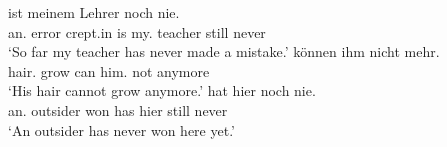 \documentclass[output=paper
 	        ,biblatex
                ,babelshorthands
                ,newtxmath
                ,draftmode
                ,colorlinks, citecolor=brown
]{langscibook}
\begin{document}
\begin{exe}
\ex\label{ex:erg-subj-fronted}
  \begin{xlist}
  \ex\label{ex:erg-subj-fronted-indef} ist meinem Lehrer noch nie.\\
         {\LB}an.\nom{} error {crept.in} is my.\dat{} teacher still never\\
         \trans `So far my teacher has never made a mistake.'
  \ex{} können ihm nicht mehr.\\
          {\LB}hair.\nom{} grow can him.\dat{} not anymore\\
          \trans `His hair cannot grow anymore.'
\ex\label{ex:nonerg-subj-fronted}
       hat hier noch nie.\\
           {\LB}an.\nom{} outsider won has hier still never\\
        \trans `An outsider has never won here yet.' 
  \end{xlist}
\end{exe}
\end{document}
